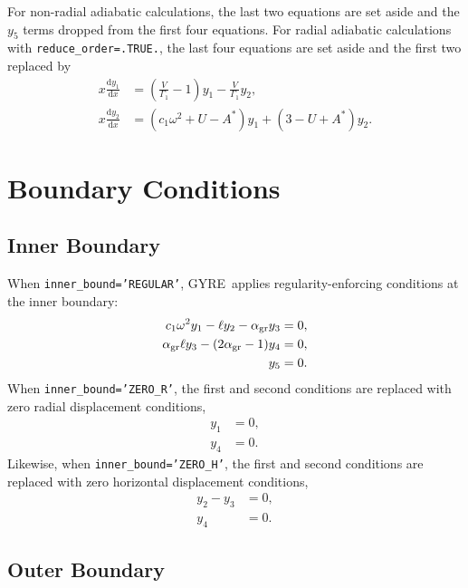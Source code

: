 \documentclass[fleqn]{article}
\newcommand{\gyre}{GYRE}
\newcommand{\diff}{\mathrm{d}}
\newcommand{\Vg}{\frac{V}{\Gamma_{1}}}
\newcommand{\As}{A^{\ast}}
\newcommand{\agr}{\alpha_{\rm gr}}
\begin{document}
For non-radial adiabatic calculations, the last two equations are set
aside and the $y_{5}$ terms dropped from the first four equations. For
radial adiabatic calculations with \texttt{reduce\_order=.TRUE.}, the
last four equations are set aside and the first two replaced by
\begin{align*}
x \frac{\diff y_{1}}{\diff x} &=
\left(\Vg - 1 \right) y_{1} 
- \Vg y_{2}, \\
x \frac{\diff y_{2}}{\diff x} &=
(c_{1} \omega^{2} + U - \As ) y_{1} +
(3 - U + \As) y_{2}.
\end{align*}

\section*{Boundary Conditions}

\subsection*{Inner Boundary}

When \texttt{inner\_bound='REGULAR'}, \gyre\ applies
regularity-enforcing conditions at the inner boundary:
\begin{align*}
c_{1} \omega^{2} y_{1} - \ell y_{2} - \agr y_{3} &= 0, \\
\agr \ell y_{3} - (2\agr - 1) y_{4} &= 0, \\
y_{5} &= 0.
\end{align*}
When \texttt{inner\_bound='ZERO\_R'}, the first and second conditions are replaced with zero radial displacement conditions,
\begin{align*}
y_{1} &= 0, \\
y_{4} &= 0.
\end{align*}
Likewise, when \texttt{inner\_bound='ZERO\_H'}, the first and second conditions are replaced with zero horizontal displacement conditions,
\begin{align*}
y_{2} - y_{3} &= 0, \\
y_{4} &= 0.
\end{align*}


\subsection*{Outer Boundary}
 
\end{document}

